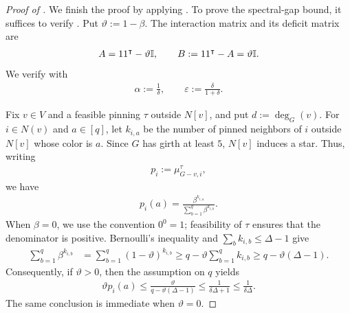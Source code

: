 \documentclass[10pt,a4paper]{amsart}
\renewcommand{\epsilon}{\varepsilon}
\begin{document}
\begin{proof}[Proof of ]
We finish the proof by applying .
To prove the spectral-gap bound, it suffices to verify
.
Put $\vartheta:=1-\beta$.  The interaction matrix and its deficit matrix
are
\begin{align*}
  A=\*1\*1^\intercal-\vartheta\mathbb I,
  \qquad
  B:=\*1\*1^\intercal-A=\vartheta\mathbb I.
\end{align*}
We verify  with
\begin{align*}
  \alpha:=\frac1\delta,
  \qquad
  \epsilon:=\frac{\delta}{1+\delta}.
\end{align*}

Fix $v\in V$ and a feasible pinning $\tau$ outside $N[v]$, and put
$d:=\deg_G(v)$.  For $i\in N(v)$ and $\!a\in[q]$, let
$k_{i,\!a}$ be the number of pinned neighbors of $i$ outside $N[v]$
whose color is $\!a$.  Since $G$ has girth at least $5$, $N[v]$
induces a star.  Thus, writing
\begin{align*}
  p_i:=\mu^\tau_{G-v,i},
\end{align*}
we have
\begin{align*}
  p_i(\!a)
  =
  \frac{\beta^{k_{i,\!a}}}
       {\sum_{\!b=1}^q\beta^{k_{i,\!b}}}.
\end{align*}
When $\beta=0$, we use the convention $0^0=1$; feasibility of $\tau$
ensures that the denominator is positive.  Bernoulli's inequality and
$\sum_{\!b}k_{i,\!b}\leq\Delta-1$ give
\begin{align*}
  \sum_{\!b=1}^q\beta^{k_{i,\!b}}
  &=
  \sum_{\!b=1}^q(1-\vartheta)^{k_{i,\!b}}
  \geq
  q-\vartheta\sum_{\!b=1}^q k_{i,\!b}
  \geq
  q-\vartheta(\Delta-1).
\end{align*}
Consequently, if $\vartheta>0$, then the assumption on $q$ yields
\begin{align}
  \vartheta p_i(\!a)
  \leq
  \frac{\vartheta}{q-\vartheta(\Delta-1)}
  \leq
  \frac1{\delta\Delta+1}
  \leq
  \frac1{\delta\Delta}.
  \label{eq:Potts-leaf-interaction-bound}
\end{align}
The same conclusion is immediate when $\vartheta=0$.


\end{proof}
\end{document}

